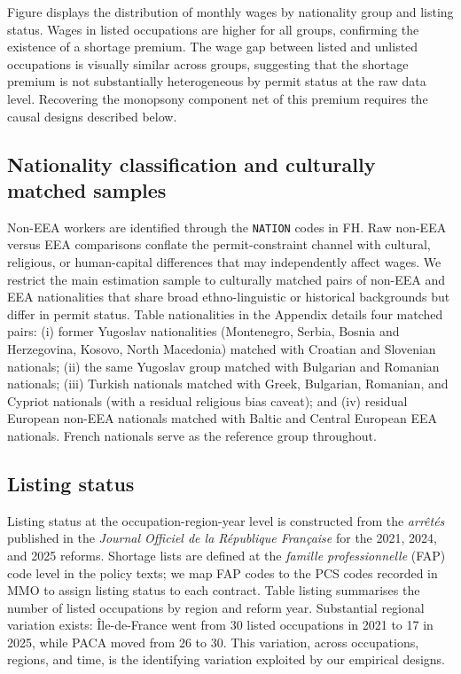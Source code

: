 \documentclass[9pt]{article}
\begin{document}
Figure %
displays the distribution of monthly wages by nationality
group and listing status. Wages in listed occupations are higher for all groups,
confirming the existence of a shortage premium. The wage gap between listed and
unlisted occupations is visually similar across groups, suggesting that the shortage
premium is not substantially heterogeneous by permit status at the raw data level.
Recovering the monopsony component net of this premium requires the causal designs
described below.

\subsection{Nationality classification and culturally matched samples}

Non-EEA workers are identified through the \texttt{NATION} codes in FH. Raw
non-EEA versus EEA comparisons conflate the permit-constraint channel with cultural,
religious, or human-capital differences that may independently affect wages. We
restrict the main estimation sample to culturally matched pairs of non-EEA
and EEA nationalities that share broad ethno-linguistic or historical backgrounds
but differ in permit status. Table nationalities in the Appendix details four
matched pairs: (i) former Yugoslav nationalities (Montenegro, Serbia, Bosnia and
Herzegovina, Kosovo, North Macedonia) matched with Croatian and Slovenian nationals;
(ii) the same Yugoslav group matched with Bulgarian and Romanian nationals;
(iii) Turkish nationals matched with Greek, Bulgarian, Romanian, and Cypriot nationals
(with a residual religious bias caveat); and (iv) residual European non-EEA nationals
matched with Baltic and Central European EEA nationals. French nationals serve as
the reference group throughout.

\subsection{Listing status}

Listing status at the occupation-region-year level is constructed from the
\textit{arrêtés} published in the \textit{Journal Officiel de la République
Française} for the 2021, 2024, and 2025 reforms. Shortage lists are defined at
the \textit{famille professionnelle} (FAP) code level in the policy texts; we map
FAP codes to the PCS codes recorded in MMO to assign listing status to each
contract. Table listing summarises the number of listed occupations by
region and reform year. Substantial regional variation exists: Île-de-France went
from 30 listed occupations in 2021 to 17 in 2025, while PACA moved from 26 to 30.
This variation, across occupations, regions, and time, is the identifying variation
exploited by our empirical designs.
\end{document}
